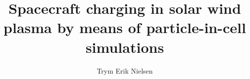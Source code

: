 \documentclass[a4paper, american]{memoir}
\title{Spacecraft charging in solar wind plasma by means of particle-in-cell simulations}
\author{Trym Erik Nielsen}
\begin{document}
    \frontmatter        %

    \masterfrontpage
    
    
    

    \cleartorecto
    \tableofcontents    %
    \cleartorecto
    \listoffigures      %
    \cleartorecto
    \listoftables       %

    \mainmatter         %

    
    
    
    
    
    
    

    \appendix           %
    \appendixpage       %

    
    

    \backmatter         %

    \printbibliography
\end{document}
